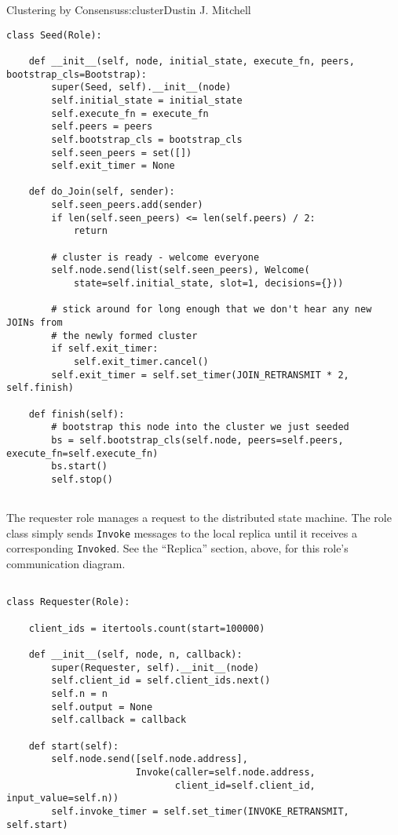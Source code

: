 \begin{aosachapter}{Clustering by Consensus}{s:cluster}{Dustin J. Mitchell}
\begin{verbatim}
class Seed(Role):

    def __init__(self, node, initial_state, execute_fn, peers, bootstrap_cls=Bootstrap):
        super(Seed, self).__init__(node)
        self.initial_state = initial_state
        self.execute_fn = execute_fn
        self.peers = peers
        self.bootstrap_cls = bootstrap_cls
        self.seen_peers = set([])
        self.exit_timer = None

    def do_Join(self, sender):
        self.seen_peers.add(sender)
        if len(self.seen_peers) <= len(self.peers) / 2:
            return

        # cluster is ready - welcome everyone
        self.node.send(list(self.seen_peers), Welcome(
            state=self.initial_state, slot=1, decisions={}))

        # stick around for long enough that we don't hear any new JOINs from
        # the newly formed cluster
        if self.exit_timer:
            self.exit_timer.cancel()
        self.exit_timer = self.set_timer(JOIN_RETRANSMIT * 2, self.finish)

    def finish(self):
        # bootstrap this node into the cluster we just seeded
        bs = self.bootstrap_cls(self.node, peers=self.peers, execute_fn=self.execute_fn)
        bs.start()
        self.stop()
    
\end{verbatim}

\label{requester}

The requester role manages a request to the distributed state machine.
The role class simply sends \texttt{Invoke} messages to the local
replica until it receives a corresponding \texttt{Invoked}. See the
``Replica'' section, above, for this role's communication diagram.

\begin{verbatim}

class Requester(Role):

    client_ids = itertools.count(start=100000)

    def __init__(self, node, n, callback):
        super(Requester, self).__init__(node)
        self.client_id = self.client_ids.next()
        self.n = n
        self.output = None
        self.callback = callback

    def start(self):
        self.node.send([self.node.address], 
                       Invoke(caller=self.node.address, 
                              client_id=self.client_id, input_value=self.n))
        self.invoke_timer = self.set_timer(INVOKE_RETRANSMIT, self.start)


\end{verbatim}
\end{aosachapter}
